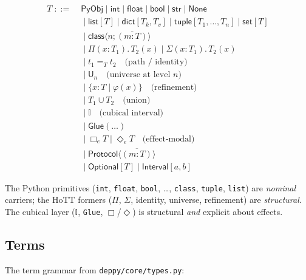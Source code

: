\begin{align*}
  T \;{::=}\;& \mathsf{PyObj} \mid \mathsf{int} \mid \mathsf{float} \mid \mathsf{bool} \mid \mathsf{str} \mid \mathsf{None}\\
            &{}\mid \mathsf{list}[T] \mid \mathsf{dict}[T_k, T_v] \mid \mathsf{tuple}[T_1, \dots, T_n] \mid \mathsf{set}[T] \\
            &{}\mid \mathsf{class}\langle n; \overline{(m : T)}\rangle \\
            &{}\mid \Pi(x : T_1).\, T_2(x) \mid \Sigma(x : T_1).\, T_2(x) \\
            &{}\mid t_1 =_T t_2     \quad \text{(path / identity)}\\
            &{}\mid \mathsf{U}_n     \quad \text{(universe at level $n$)}\\
            &{}\mid \{x : T \mid \varphi(x)\}     \quad \text{(refinement)}\\
            &{}\mid T_1 \cup T_2     \quad \text{(union)}\\
            &{}\mid \mathbb{I}     \quad \text{(cubical interval)}\\
            &{}\mid \mathsf{Glue}(\dots) \\
            &{}\mid \Box_e T \mid \Diamond_e T     \quad \text{(effect-modal)}\\
            &{}\mid \mathsf{Protocol}\langle \overline{(m : T)}\rangle \\
            &{}\mid \mathsf{Optional}[T] \mid \mathsf{Interval}[a, b]
\end{align*}

The Python primitives (\texttt{int}, \texttt{float}, \texttt{bool},
\dots, \texttt{class}, \texttt{tuple}, \texttt{list}) are
\emph{nominal} carriers; the HoTT formers ($\Pi$, $\Sigma$, identity,
universe, refinement) are \emph{structural}.  The cubical layer
($\mathbb{I}$, \texttt{Glue}, $\Box$/$\Diamond$) is structural
\emph{and} explicit about effects.

\subsection{Terms}

The term grammar from \texttt{deppy/core/types.py}:

